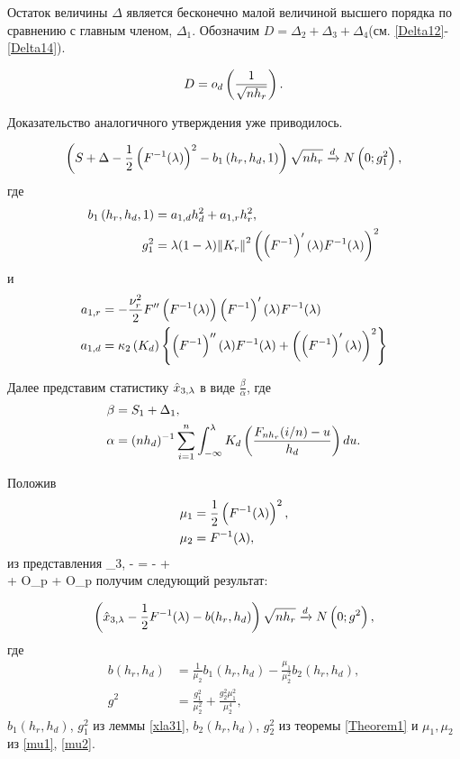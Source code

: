 \documentclass[a4paper,14pt,russian]{article}
\begin{document}
Остаток величины $\Delta$ является бесконечно малой величиной высшего порядка по сравнению с главным членом, $\Delta_{1}$. Обозначим $D= \Delta_{2}+\Delta_{3}+\Delta_{4}$(см. \eqref{Delta12}-\eqref{Delta14}).
\begin{lemma}
$$
D=o_d\left(\frac{1}{\sqrt{n h_r}}\right).
$$
\end{lemma}

Доказательство аналогичного утверждения уже приводилось.

\begin{lemma}
  $$
  \left(S+\Delta -\frac12 \left(F^{-1}(\lambda)\right)^2 -b_1\left(h_r,h_d,1\right)\right)\sqrt{n h_r} \xrightarrow{d} N\left(0;g_1^2\right),
  $$
  где
 \begin{align*}
  b_1\left(h_r,h_d,1\right) &= a_{1,d} h_d^2 + a_{1,r} h_r^2,\\
  g_1^2 &= \lambda (1- \lambda) \norm{K_r}^2 \left(\left(F^{-1}\right)'(\lambda)F^{-1}(\lambda)\right)^2
\end{align*}
и
 \begin{align*}
  a_{1,r} &= -\frac{\nu_r^2}{2} F''\left(F^{-1}(\lambda)\right)\left(F^{-1}\right)'(\lambda) F^{-1}(\lambda)\\
  a_{1,d} &=  \kappa_2\left(K_d\right)\left\{\left(F^{-1}\right)''(\lambda)F^{-1}(\lambda)+\left(\left(F^{-1}\right)'(\lambda)\right)^2\right\}
\end{align*}\label{xla31}
\end{lemma}

Далее представим статистику $\hat{x}_{3,\lambda}$ в виде $\frac{\beta}{\alpha}$,
где
\begin{align*}
  \beta &= S_1 + \Delta_1,\\
  \alpha &=  (n h_d)^{-1} \sum_{i=1}^{n} \int_{-\infty}^{\lambda} K_d\left(\frac{F_{n h_r}(i/n)-u}{h_d}\right)du.
\end{align*}

Положив
\begin{align}
\label{mu1}
\mu_1 &= \frac12 \left(F^{-1}(\lambda)\right)^2,\\
\label{mu2}
\mu_2 &= F^{-1}(\lambda),
\end{align}
из представления
\ml
{
_{3,\la} -   =   -
      +\\+ O_p + O_p
}
получим следующий результат:
\begin{theorem}
   \begin{equation*}
   \left(\hat{x}_{3,\lambda} - \frac12 F^{-1}(\lambda) - b(h_r,h_d)\right)\sqrt{n h_r} \xrightarrow{d} N\left(0;g^2\right),
   \end{equation*}
   где
   \begin{align*}
     b(h_r,h_d) &= \frac{1}{\mu_2}b_1(h_r,h_d) - \frac{\mu_1}{\mu_2^2} b_2(h_r,h_d),\\
     g^2 &= \frac{g_1^2}{\mu_2^2} + \frac{g_2^2 \mu_1^2}{\mu_2^4},
   \end{align*}
   $b_1(h_r,h_d)$, $g_1^2$ из леммы  \eqref{xla31}, $b_2(h_r,h_d)$, $g_2^2$ из теоремы \eqref{Theorem1} и $\mu_1, \mu_2$ из \eqref{mu1}, \eqref{mu2}.
   \label{T2}
\end{theorem}
\end{document}
